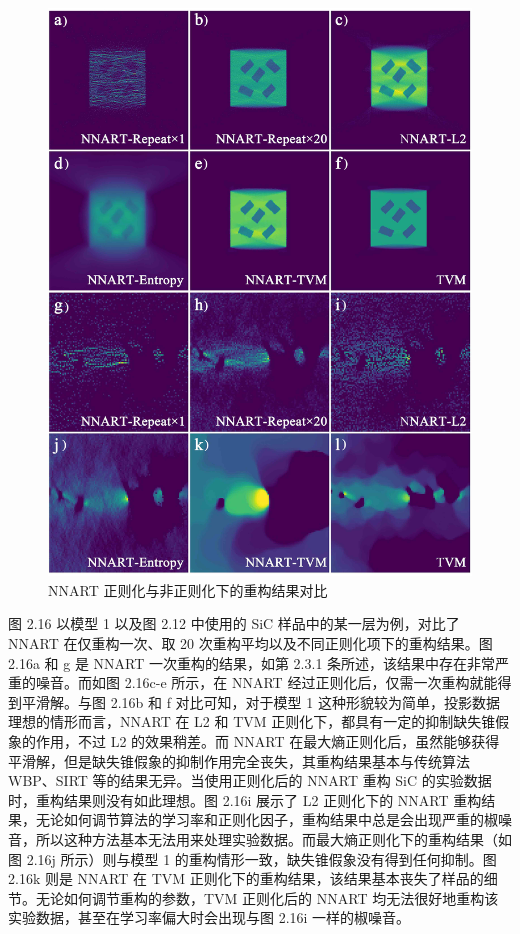 \begin{figure}[htbp]
	\vspace{\baselineskip}
	\centering
	\includegraphics[width=1.0\textwidth]{../3.11/311}
	\caption{NNART 正则化与非正则化下的重构结果对比}\label{fig:311}
	\song{}
\end{figure}

图 2.16 以模型 1 以及图 2.12 中使用的 SiC 样品中的某一层为例，对比了 NNART 在仅重构一次、取 20 次重构平均以及不同正则化项下的重构结果。图 2.16a 和 g 是 NNART 一次重构的结果，如第 2.3.1 条所述，该结果中存在非常严重的噪音。而如图 2.16c-e 所示，在 NNART 经过正则化后，仅需一次重构就能得到平滑解。与图 2.16b 和 f 对比可知，对于模型 1 这种形貌较为简单，投影数据理想的情形而言，NNART 在 L2 和 TVM 正则化下，都具有一定的抑制缺失锥假象的作用，不过 L2 的效果稍差。而 NNART 在最大熵正则化后，虽然能够获得平滑解，但是缺失锥假象的抑制作用完全丧失，其重构结果基本与传统算法 WBP、SIRT 等的结果无异。当使用正则化后的 NNART 重构 SiC 的实验数据时，重构结果则没有如此理想。图 2.16i 展示了 L2 正则化下的 NNART 重构结果，无论如何调节算法的学习率和正则化因子，重构结果中总是会出现严重的椒噪音，所以这种方法基本无法用来处理实验数据。而最大熵正则化下的重构结果（如图 2.16j 所示）则与模型 1 的重构情形一致，缺失锥假象没有得到任何抑制。图 2.16k 则是 NNART 在 TVM 正则化下的重构结果，该结果基本丧失了样品的细节。无论如何调节重构的参数，TVM 正则化后的 NNART 均无法很好地重构该实验数据，甚至在学习率偏大时会出现与图 2.16i 一样的椒噪音。



